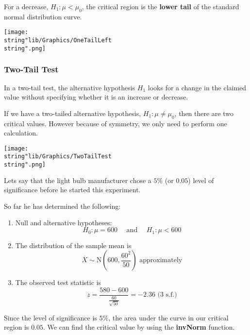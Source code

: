 \documentclass[11pt,a4paper]{book}
\begin{document}
\begin{minipage}[t]{.5\textwidth}

For a decrease, $H_{1}:\mu<\mu_{0}$, the critical region is the \textbf{lower
tail} of the standard normal distribution curve.

\end{minipage}
\begin{minipage}[t]{.5\textwidth}
\begin{center}
\texttt{[image: \\string"lib/Graphics/OneTailLeft\\string".png]}
\par\end{center}

\end{minipage}

\subsubsection*{Two-Tail Test}

In a two-tail test, the alternative hypothesis $H_{1}$ looks for
a change in the claimed value without specifying whether it is an
increase or decrease.

If we have a two-tailed alternative hypothesis, $H_{1}:\mu\neq\mu_{0}$,
then there are two critical values. However because of symmetry, we
only need to perform one calculation.
\begin{center}
\texttt{[image: \\string"lib/Graphics/TwoTailTest\\string".png]}
\par\end{center}

\newpage

Lets say that the light bulb manufacturer chose a $5\%$ (or $0.05$)
level of significance before he started this experiment.

So far he has determined the following:
\begin{enumerate}
\item Null and alternative hypotheses:
\[
H_{0}:\mu=600\quad\text{ and }\quad H_{1}:\mu<600
\]
\item The distribution of the sample mean is
\[
\overline{X}\sim\text{N}\left(600,\frac{60^{2}}{50}\right)\text{ approximately}
\]
\item The observed test statistic is
\[
{\displaystyle z=\frac{580-600}{\frac{60}{\sqrt{50}}}}=-2.36\text{ (3 s.f.)}
\]
\end{enumerate}
Since the level of significance is $5\%$, the area under the curve
in our critical region is $0.05$. We can find the critical value
by using the \textbf{invNorm} function.
\end{document}
